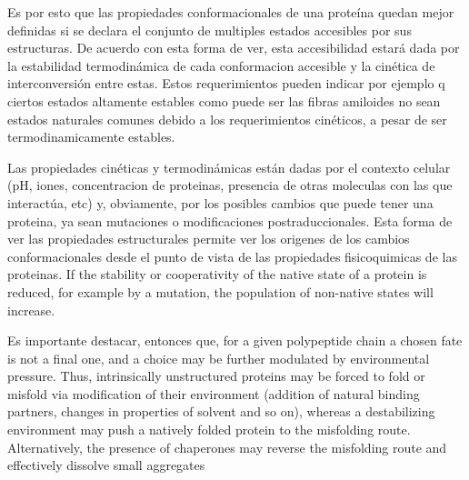 Es por esto que las propiedades conformacionales de una proteína quedan mejor definidas si se declara el conjunto de multiples estados accesibles por sus estructuras.
De acuerdo con esta forma de ver, esta accesibilidad estará dada por la estabilidad termodinámica de cada conformacion accesible y la cinética de interconversión entre estas.
Estos requerimientos pueden indicar por ejemplo q ciertos estados altamente estables como puede ser las fibras amiloides no sean estados naturales comunes debido a los requerimientos cinéticos, a pesar de ser termodinamicamente estables.

Las propiedades cinéticas y termodinámicas están dadas por el contexto celular (pH, iones, concentracion de proteinas, presencia de otras moleculas con las que interactúa, etc) y, obviamente, por los posibles cambios que puede tener una proteina,
ya sean mutaciones o modificaciones postraduccionales.
Esta forma de ver las propiedades estructurales permite ver los origenes de los cambios conformacionales desde el punto de vista de las propiedades fisicoquimicas de las proteinas.
If the stability or cooperativity of the native state of a protein is reduced, for example by a mutation, the population of non-native states will increase.


Es importante destacar, entonces que, for a given polypeptide chain a chosen fate is not a final one, and a choice may be further modulated by environmental pressure. 
Thus, intrinsically unstructured proteins may be forced to fold or misfold via modification of their environment (addition of natural binding partners, changes in properties of solvent and so on), whereas a destabilizing environment may push a natively
folded protein to the misfolding route. Alternatively, the
presence of chaperones may reverse the misfolding route
and effectively dissolve small aggregates




